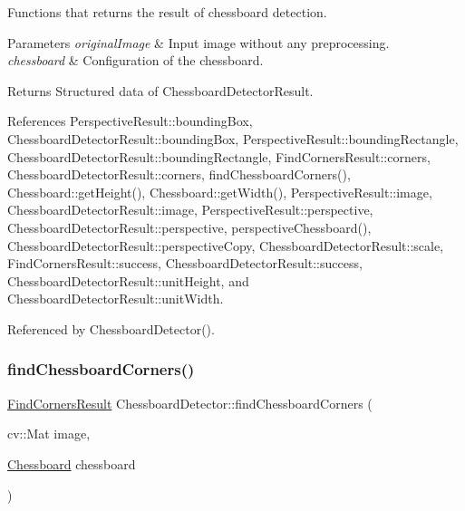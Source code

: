 Functions that returns the result of chessboard detection. 


\begin{DoxyParams}{Parameters}
{\em original\+Image} & Input image without any preprocessing. \\
\hline
{\em chessboard} & Configuration of the chessboard. \\
\hline
\end{DoxyParams}
\begin{DoxyReturn}{Returns}
Structured data of Chessboard\+Detector\+Result. 
\end{DoxyReturn}


References Perspective\+Result\+::bounding\+Box, Chessboard\+Detector\+Result\+::bounding\+Box, Perspective\+Result\+::bounding\+Rectangle, Chessboard\+Detector\+Result\+::bounding\+Rectangle, Find\+Corners\+Result\+::corners, Chessboard\+Detector\+Result\+::corners, find\+Chessboard\+Corners(), Chessboard\+::get\+Height(), Chessboard\+::get\+Width(), Perspective\+Result\+::image, Chessboard\+Detector\+Result\+::image, Perspective\+Result\+::perspective, Chessboard\+Detector\+Result\+::perspective, perspective\+Chessboard(), Chessboard\+Detector\+Result\+::perspective\+Copy, Chessboard\+Detector\+Result\+::scale, Find\+Corners\+Result\+::success, Chessboard\+Detector\+Result\+::success, Chessboard\+Detector\+Result\+::unit\+Height, and Chessboard\+Detector\+Result\+::unit\+Width.



Referenced by Chessboard\+Detector().

\mbox{\label{classChessboardDetector_a4d0df2c6479f32286935577e1b0fca41}} 
\subsubsection{\texorpdfstring{find\+Chessboard\+Corners()}{findChessboardCorners()}}
{\footnotesize\ttfamily \hyperlink{structFindCornersResult}{Find\+Corners\+Result} Chessboard\+Detector\+::find\+Chessboard\+Corners (\begin{DoxyParamCaption}\item[{cv\+::\+Mat}]{image,  }\item[{\hyperlink{classChessboard}{Chessboard}}]{chessboard }\end{DoxyParamCaption})}



